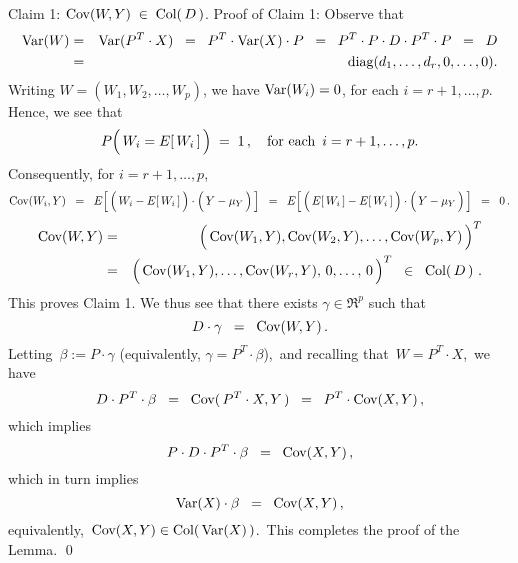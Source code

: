 \vskip 0.5cm
\noindent
\textnormal{Claim 1:}\quad
$\textnormal{Cov}(W,Y) \; \in \; \textnormal{Col}\!\left(\,D\,\right)$.
\vskip 0.2cm
\noindent
Proof of Claim 1: Observe that
\begin{eqnarray*}
\textnormal{Var}(W)
& = & \textnormal{Var}(P^{T} \cdot X)
	\;\; = \;\; P^{T} \cdot \textnormal{Var}(X) \cdot P 
	\;\; = \;\; P^{T} \cdot P \cdot D \cdot P^{T} \cdot P 
	\;\; = \;\; D
\\
& = & \textnormal{diag}(d_{1},\ldots,d_{r},0,\ldots,0).
\end{eqnarray*}
Writing $W = (W_{1},W_{2},\ldots,W_{p})$, we have
$\textnormal{Var}(W_{i}) = 0$, for each $i = r+1, \ldots, p$.
Hence, we see that
\begin{equation*}
P\!\left(\,W_{i} \overset{{\color{white}+}}{=} E\!\left[\,W_{i}\,\right]\,\right) \; = \; 1\,,
\quad
\textnormal{for each \,$i = r+1, \ldots, p$}.
\end{equation*}
Consequently, for $i = r+1,\ldots,p$,
\begin{equation*}
\Cov(W_{i},Y)
\;\; = \;\; E\!\left[\,
	\left(\,W_{i} \overset{{\color{white}.}}{-} E\!\left[\,W_{i}\,\right]\,\right)
	\cdot
	\left(\,Y \overset{{\color{white}.}}{-} \mu_{Y}\,\right)
	\,\right]
\;\; = \;\; E\!\left[\,
	\left(\,E\!\left[\,W_{i}\,\right] \overset{{\color{white}.}}{-} E\!\left[\,W_{i}\,\right]\,\right)
	\cdot
	\left(\,Y \overset{{\color{white}.}}{-} \mu_{Y}\,\right)
	\,\right]
\;\; = \;\;
	0\,.
\end{equation*}
\begin{eqnarray*}
\Cov(W,Y)
& = & \left(\,\Cov(W_{1},\overset{{\color{white}.}}{Y}),\Cov(W_{2},Y),\ldots,\Cov(W_{p},Y)\,\right)^{T}
\\
& = & \left(\,\Cov(W_{1},\overset{{\color{white}.}}{Y}),\ldots,\Cov(W_{r},Y),\,0,\ldots,\,0\,\right)^{T}
\;\; \in \;\; \Col\!\left(\,D\,\right)\,.
\end{eqnarray*}
This proves Claim 1.
We thus see that there exists $\gamma \in \Re^{p}$ such that
\begin{equation*}
D \cdot \gamma \;\; =\;\; \textnormal{Cov}(W,Y)\,.
\end{equation*}
Letting \,$\beta := P \cdot \gamma$ (equivalently, $\gamma = P^{T} \cdot \beta$),\, and
recalling that \,$W = P^{T} \cdot X$,\, we have
\begin{equation*}
D \cdot P^{T} \cdot \beta
\;\; =\;\; \textnormal{Cov}(\,P^{T} \cdot X,Y\,)
\;\; =\;\; P^{T} \cdot \textnormal{Cov}(X,Y)\,,
\end{equation*}
which implies
\begin{equation*}
P \cdot D \cdot P^{T} \cdot \beta
\;\; =\;\; \textnormal{Cov}(X,Y)\,,
\end{equation*}
which in turn implies
\begin{equation*}
\textnormal{Var}(X) \cdot \beta
\;\; =\;\; \textnormal{Cov}(X,Y)\,,
\end{equation*}
equivalently, \,$\textnormal{Cov}(X,Y) \in \textnormal{Col}(\,\textnormal{Var}(X)\,)$.\,
This completes the proof of the Lemma.
\qed


